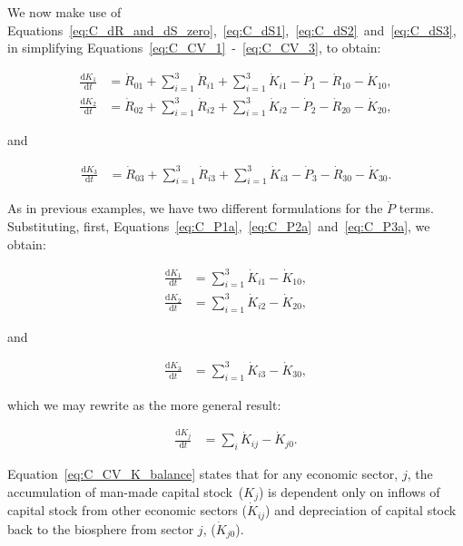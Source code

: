 We now make use of 
Equations~\ref{eq:C_dR_and_dS_zero},~\ref{eq:C_dS1},~\ref{eq:C_dS2}~and~\ref{eq:C_dS3},
in simplifying Equations~\ref{eq:C_CV_1}~-~\ref{eq:C_CV_3},
to obtain:

\begin{align} \label{eq:C_CV_1a}
	\frac{\mathrm{d}K_{1}}{\mathrm{d}t}		
	& =  \dot{R}_{01} 
	+ \sum_{i = 1}^{3}\dot{R}_{i1}
	+ \sum_{i = 1}^{3}\dot{K}_{i1}
	- \dot{P}_{1}
	- \dot{R}_{10} 
	- \dot{K}_{10},										\\
	\label{eq:C_CV_2a}
	\frac{\mathrm{d}K_{2}}{\mathrm{d}t}		
	& =  \dot{R}_{02} 
	+ \sum_{i = 1}^{3}\dot{R}_{i2}
	+ \sum_{i = 1}^{3}\dot{K}_{i2}
	- \dot{P}_{2}
	- \dot{R}_{20} 
	- \dot{K}_{20},
\end{align}

\noindent{}and

\begin{align}
	\label{eq:C_CV_3a}
	\frac{\mathrm{d}K_{3}}{\mathrm{d}t}		
	& =  \dot{R}_{03} 
	+ \sum_{i = 1}^{3}\dot{R}_{i3}
	+ \sum_{i = 1}^{3}\dot{K}_{i3}
	- \dot{P}_{3}
	- \dot{R}_{30} 
	- \dot{K}_{30}.										
\end{align}

As in previous examples,
we have two different formulations for
the $\dot{P}$ terms.
Substituting, 
first, 
Equations~\ref{eq:C_P1a},~\ref{eq:C_P2a}~and~\ref{eq:C_P3a},
we obtain:

\begin{align} \label{eq:C_CV_1b}
	\frac{\mathrm{d}K_{1}}{\mathrm{d}t}		
	& = \sum_{i = 1}^{3}\dot{K}_{i1}
	- \dot{K}_{10},										\\
	\label{eq:C_CV_2b}
	\frac{\mathrm{d}K_{2}}{\mathrm{d}t}		
	& = \sum_{i = 1}^{3}\dot{K}_{i2}
	- \dot{K}_{20},
\end{align}

\noindent{}and

\begin{align}
	\label{eq:C_CV_3b}
	\frac{\mathrm{d}K_{3}}{\mathrm{d}t}		
	& = \sum_{i = 1}^{3}\dot{K}_{i3}
	- \dot{K}_{30},										
\end{align}

\noindent{}which we may rewrite as the 
more general result:

\begin{align} \label{eq:C_CV_K_balance}
	\frac{\mathrm{d}K_{j}}{\mathrm{d}t}		
	& =  \sum_{i}\dot{K}_{ij}
	- \dot{K}_{j0}.
\end{align}

\noindent{}Equation~\ref{eq:C_CV_K_balance} states that
for any economic sector, $j$,
the accumulation of man-made capital stock~($K_{j}$)
is dependent only on inflows of capital stock
from other economic sectors
($\dot{K}_{ij}$)
and depreciation of capital stock back to the
biosphere from sector $j$, ($\dot{K}_{j0}$).

